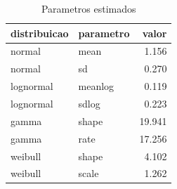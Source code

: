\begin{table}

\caption{\label{tab:parametros_dist_g10}Parametros estimados}
\centering
\begin{tabular}[t]{llr}
\toprule
distribuicao & parametro & valor\\
\midrule
normal & mean & 1.156\\
normal & sd & 0.270\\
lognormal & meanlog & 0.119\\
lognormal & sdlog & 0.223\\
gamma & shape & 19.941\\
\addlinespace
gamma & rate & 17.256\\
weibull & shape & 4.102\\
weibull & scale & 1.262\\
\bottomrule
\end{tabular}
\end{table}
